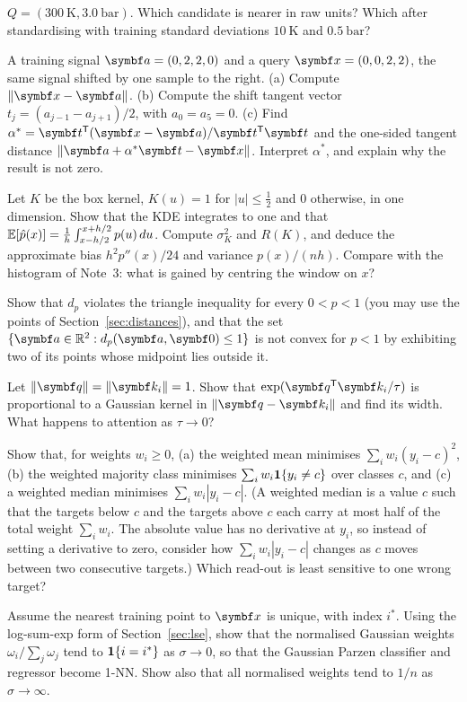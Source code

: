 \documentclass[11pt]{article}
\begin{document}
\begin{questions}
\begin{calculations}
$Q = (300\ \mathrm{K}, 3.0\ \mathrm{bar})$. Which candidate is nearer in raw units? Which after standardising with
training standard deviations $10\ \mathrm{K}$ and $0.5\ \mathrm{bar}$?
\item A training signal $\vect{a} = (0, 2, 2, 0)$ and a query $\x = (0, 0, 2, 2)$, the same signal shifted by one
sample to the right. (a) Compute $\norm{\x - \vect{a}}$. (b) Compute the shift tangent vector $t_j = (a_{j-1} -
a_{j+1})/2$, with $a_0 = a_5 = 0$. (c) Find $\alpha^* = \vect{t}\T(\x - \vect{a})/\vect{t}\T\vect{t}$ and the
one-sided tangent distance $\norm{\vect{a} + \alpha^*\vect{t} - \x}$. Interpret $\alpha^*$, and explain why the
result is not zero.
\end{calculations}

\begin{derivations}
\item Let $K$ be the box kernel, $K(u) = 1$ for $|u| \le \frac{1}{2}$ and 0 otherwise, in one dimension. Show that the
KDE integrates to one and that $\mathbb{E}[\hat p(x)] = \frac{1}{h}\int_{x - h/2}^{x + h/2} p(u)\, du$. Compute $\sigma_K^2$
and $R(K)$, and deduce the approximate bias $h^2 p''(x)/24$ and variance $p(x)/(nh)$. Compare with the histogram of
Note~3: what is gained by centring the window on $x$?
\item Show that $d_p$ violates the triangle inequality for every $0 < p < 1$ (you may use the points of
Section~\ref{sec:distances}), and that the set $\{\vect{a} \in \R^2 : d_p(\vect{a}, \vect{0}) \le 1\}$ is not convex
for $p < 1$ by exhibiting two of its points whose midpoint lies outside it.
\item Let $\norm{\vect{q}} = \norm{\vect{k}_i} = 1$. Show that $\exp(\vect{q}\T\vect{k}_i / \tau)$ is proportional
to a Gaussian kernel in $\norm{\vect{q} - \vect{k}_i}$ and find its width. What happens to attention as
$\tau \to 0$?
\item Show that, for weights $w_i \ge 0$, (a) the weighted mean minimises $\sum_i w_i (y_i - c)^2$, (b) the weighted
majority class minimises $\sum_i w_i \mathbf{1}\!\left\{y_i \ne c\right\}$ over classes $c$, and (c) a weighted median minimises
$\sum_i w_i |y_i - c|$. (A weighted median is a value $c$ such that the targets below $c$ and the targets above $c$
each carry at most half of the total weight $\sum_i w_i$. The absolute value has no derivative at $y_i$, so instead
of setting a derivative to zero, consider how $\sum_i w_i |y_i - c|$ changes as $c$ moves between two consecutive
targets.) Which read-out is least sensitive to one wrong target?
\item Assume the nearest training point to $\x$ is unique, with index $i^*$. Using the log-sum-exp form of
Section~\ref{sec:lse}, show that the normalised Gaussian weights $\omega_i / \sum_j \omega_j$ tend to
$\mathbf{1}\!\left\{i = i^*\right\}$ as $\sigma \to 0$, so that the Gaussian Parzen classifier and regressor become 1-NN. Show also that
all normalised weights tend to $1/n$ as $\sigma \to \infty$.
\end{derivations}


\end{questions}
\end{document}
